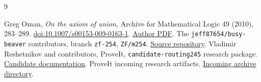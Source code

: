 \documentclass[11pt]{article}
\begin{document}
\begin{thebibliography}{9}\small\raggedright
{} Greg Oman, \emph{On the axiom of union}, Archive for
Mathematical Logic 49 (2010), 283--289.
\href{https://doi.org/10.1007/s00153-009-0163-1}{doi:10.1007/s00153-009-0163-1}.
\href{https://faculty.uccs.edu/goman/wp-content/uploads/sites/15/2021/02/On_the_axiom_of_union.pdf}{Author PDF}.
 The \texttt{jeff87654/busy-beaver} contributors,
branch \texttt{zf-254}, \texttt{ZF/m254}.
\href{https://github.com/jeff87654/busy-beaver/tree/zf-254/ZF/m254}{Source repository}.
 Vladimir Reshetnikov and contributors, ProveIt,
\texttt{candidate-routing245} research package.
\href{https://github.com/VladimirReshetnikov/ProveIt/blob/main/Computability/BusyBeaver/Research/ZFC/candidate-routing245/README.md}{Candidate documentation}.
 ProveIt incoming research artifacts.
\href{https://github.com/VladimirReshetnikov/ProveIt/tree/main/docs/incoming}{Incoming archive directory}.
\end{thebibliography}
\end{document}
